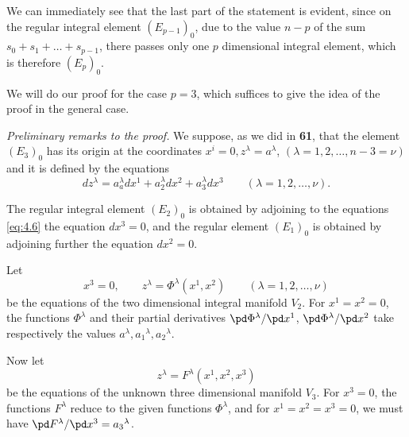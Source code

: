 We can immediately see that the last part of the statement is evident, since on the regular integral element $(E_{p-1})_{0}$, due to the value $n-p$ of the sum $s_{0}+s_{1}+\dots+s_{p-1}$, there passes only one $p$ dimensional integral element, which is therefore $(E_{p})_{0}$.

We will do our proof for the case $p=3$, which suffices to give the idea of the proof in the general case.


\vspace{12pt}\fsec \emph{Preliminary remarks to the proof.} We suppose, as we did in \textsection\textbf{61}, that the element $(E_{3})_{0}$ has its origin at the coordinates $x^{i}=0,z^{\lambda}=a^{\lambda}$, $(\lambda=1,2,\dots,n-3=\nu)$ and it is defined by the equations
\begin{equation}
  \label{eq:4.6}
  dz^{\lambda}=a^{\lambda}_{a}dx^{1}+a^{\lambda}_{2}dx^{2}+a^{\lambda}_{3}dx^{3}\qquad (\lambda=1,2,\dots,\nu).
\end{equation}

The regular integral element $(E_{2})_{0}$ is obtained by adjoining to the equations \eqref{eq:4.6} the equation $dx^{3}=0$, and the regular element $(E_{1})_{0}$ is obtained by adjoining further the equation $dx^{2}=0$.

Let
\[
x^{3}=0,\qquad z^{\lambda}=\Phi^{\lambda}(x^{1},x^{2})\qquad(\lambda=1,2,\dots,\nu)
\]
be the equations of the two dimensional integral manifold $V_{2}$. For $x^{1}=x^{2}=0$, the functions $\Phi^{\lambda}$ and their partial derivatives $\pd \Phi^{\lambda}/\pd x^{1}$, $\pd \Phi^{\lambda}/\pd x^{2}$ take respectively the values $a^{\lambda},a_{1}{}^{\lambda},a_{2}{}^{\lambda}$.

Now let
\[
z^{\lambda}=F^{\lambda}(x^{1},x^{2},x^{3})
\]
be the equations of the unknown three dimensional manifold $V_{3}$. For $x^{3}=0$, the functions $F^{\lambda}$ reduce to the given functions $\Phi^{\lambda}$, and for $x^{1}=x^{2}=x^{3}=0$, we must have $\pd F^{\lambda}/\pd x^{3}=a_{3}{}^{\lambda}$.


